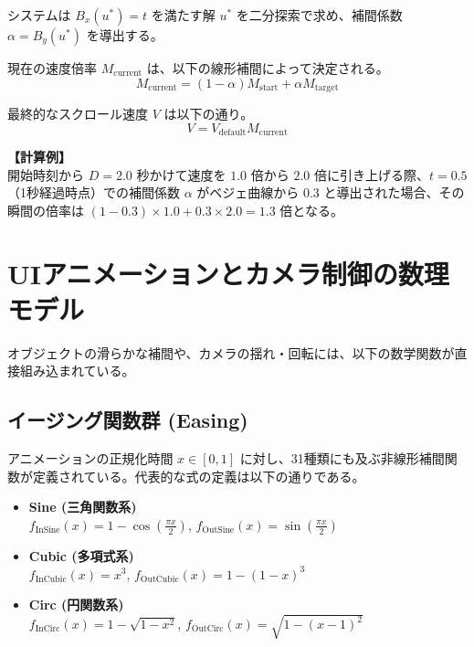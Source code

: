 \documentclass[a4paper,11pt]{ltjsarticle}
\begin{document}
システムは $B_x(u^*) = t$ を満たす解 $u^*$ を二分探索で求め、補間係数 $\alpha = B_y(u^*)$ を導出する。

現在の速度倍率 $M_{\mathrm{current}}$ は、以下の線形補間によって決定される。
\begin{equation}
    M_{\mathrm{current}} = (1 - \alpha) M_{\mathrm{start}} + \alpha M_{\mathrm{target}}
\end{equation}

最終的なスクロール速度 $V$ は以下の通り。
\begin{equation}
    V = V_{\mathrm{default}} M_{\mathrm{current}}
\end{equation}

\textbf{【計算例】} \\
開始時刻から $D = 2.0$ 秒かけて速度を $1.0$ 倍から $2.0$ 倍に引き上げる際、$t = 0.5$（1秒経過時点）での補間係数 $\alpha$ がベジェ曲線から $0.3$ と導出された場合、その瞬間の倍率は $(1 - 0.3) \times 1.0 + 0.3 \times 2.0 = 1.3$ 倍となる。

\section{UIアニメーションとカメラ制御の数理モデル}

オブジェクトの滑らかな補間や、カメラの揺れ・回転には、以下の数学関数が直接組み込まれている。

\subsection{イージング関数群 (Easing)}
アニメーションの正規化時間 $x \in [0,1]$ に対し、31種類にも及ぶ非線形補間関数が定義されている。代表的な式の定義は以下の通りである。

\begin{itemize}
    \item \textbf{Sine (三角関数系)} \\
    $f_{\mathrm{InSine}}(x) = 1 - \cos\left(\frac{\pi x}{2}\right)$, \quad
    $f_{\mathrm{OutSine}}(x) = \sin\left(\frac{\pi x}{2}\right)$
    \item \textbf{Cubic (多項式系)} \\
    $f_{\mathrm{InCubic}}(x) = x^3$, \quad
    $f_{\mathrm{OutCubic}}(x) = 1 - (1 - x)^3$
    \item \textbf{Circ (円関数系)} \\
    $f_{\mathrm{InCirc}}(x) = 1 - \sqrt{1 - x^2}$, \quad
    $f_{\mathrm{OutCirc}}(x) = \sqrt{1 - (x - 1)^2}$
\end{itemize}
\end{document}
